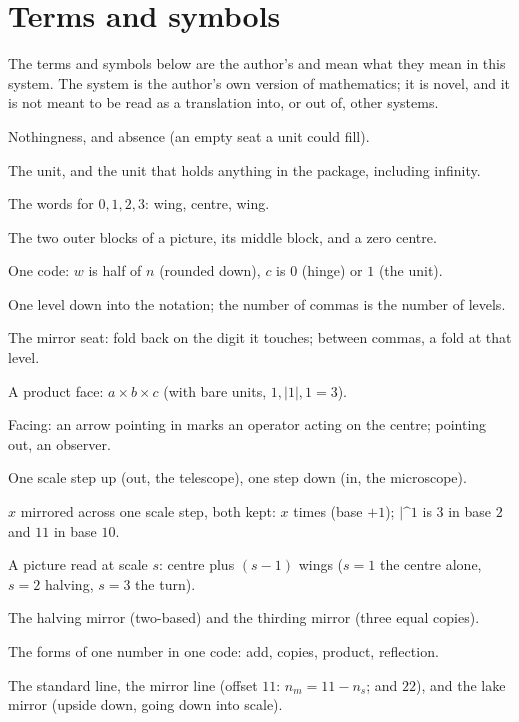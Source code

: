 \documentclass[11pt]{article}
\begin{document}
\section*{Terms and symbols}
The terms and symbols below are the author's and mean what they mean in this system. The system is the author's own version of mathematics; it is novel, and it is not meant to be read as a translation into, or out of, other systems.
\begin{description}\setlength{\itemsep}{1pt}
\item[$0_n$, $0_a$] Nothingness, and absence (an empty seat a unit could fill).
\item[$1_u$, $1_U$] The unit, and the unit that holds anything in the package, including infinity.
\item[$000, 010, 101, 111$] The words for $0, 1, 2, 3$: wing, centre, wing.
\item[wing, centre (center), hinge] The two outer blocks of a picture, its middle block, and a zero centre.
\item[$w,c,w$] One code: $w$ is half of $n$ (rounded down), $c$ is $0$ (hinge) or $1$ (the unit).
\item[comma] One level down into the notation; the number of commas is the number of levels.
\item[$|$] The mirror seat: fold back on the digit it touches; between commas, a fold at that level.
\item[$a,|b|,c$] A product face: $a\times b\times c$ (with bare units, $1,|1|,1 = 3$).
\item[$<\,>$] Facing: an arrow pointing in marks an operator acting on the centre; pointing out, an observer.
\item[$\text{\textasciicircum}$, v] One scale step up (out, the telescope), one step down (in, the microscope).
\item[$|\text{\textasciicircum}x$] $x$ mirrored across one scale step, both kept: $x$ times (base $+1$); $|\text{\textasciicircum}1$ is $3$ in base $2$ and $11$ in base $10$.
\item[$a,b,a\!:\!s$] A picture read at scale $s$: centre plus $(s-1)$ wings ($s=1$ the centre alone, $s=2$ halving, $s=3$ the turn).
\item[reflection, turn] The halving mirror (two-based) and the thirding mirror (three equal copies).
\item[faces] The forms of one number in one code: add, copies, product, reflection.
\item[s, m, lm] The standard line, the mirror line (offset $11$: $n_m = 11 - n_s$; and $22$), and the lake mirror (upside down, going down into scale).

\end{description}
\end{document}

